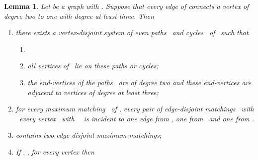 \documentclass[fleqn,12pt,twoside]{article}
\newtheorem{lemma}{Lemma}
\begin{document}
\begin{lemma}
\label{Bipartite 2->=3}Let  be a graph with .
Suppose that every edge of  connects a vertex of degree two to
one with degree at least three. Then
\end{lemma}

\begin{enumerate}
\item[(1)] \textit{there exists a vertex-disjoint system of even paths }\textit{\ and cycles }\textit{\ of }\textit{\ such that }

\begin{enumerate}
\item[(1.1)] 

\item[(1.2)] \textit{all vertices of }\textit{\ lie on these paths or
cycles;}

\item[(1.3)] \textit{the end-vertices of the paths }\textit{\ are of degree two and these end-vertices are adjacent to vertices
of degree at least three;}

\end{enumerate}

\item[(2)] \textit{for every maximum matching }\textit{\ of }\textit{,
every pair of edge-disjoint matchings }\textit{\ with }\textit{\ every vertex }\textit{\ with }\textit{\ }\textit{\ is incident to one edge from }\textit{, one from }\textit{\ and one from }\textit{.}

\item[(3)]  \textit{contains two edge-disjoint maximum matchings};

\item[(4)] \label{NuIN(2,k)graphs}\textit{If} , ,  \textit{for every vertex}  \textit{then}


\end{enumerate}
\end{document}
